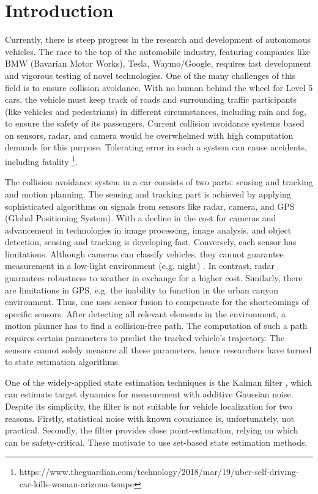 \chapter{Introduction} \label{ch:intro}
Currently, there is steep progress in the research and development of autonomous vehicles. The race to the top of the automobile industry, featuring companies like BMW (Bavarian Motor Works), Tesla, Waymo/Google, requires fast development and vigorous testing of novel technologies. One of the many challenges of this field is to ensure collision avoidance. With no human behind the wheel for Level 5 \cite{SAE2014} cars, the vehicle must keep track of roads and surrounding traffic participants (like vehicles and pedestrians) in different circumstances, including rain and fog, to ensure the safety of its passengers. Current collision avoidance systems based on sensors, radar, and camera would be overwhelmed with high computation demands for this purpose. Tolerating error in such a system can cause accidents, including fatality \footnote{https://www.theguardian.com/technology/2018/mar/19/uber-self-driving-car-kills-woman-arizona-tempe}.


The collision avoidance system in a car consists of two parts: sensing and tracking and motion planning. The sensing and tracking part is achieved by applying sophisticated algorithms on signals from sensors like radar, camera, and GPS (Global Positioning System). With a decline in the cost for cameras and advancement in technologies in image processing, image analysis, and object detection, sensing and tracking is developing fast. Conversely, each sensor has limitations. Although cameras can classify vehicles, they cannot guarantee measurement in a low-light environment (e.g. night) \cite{Hirz2018}. In contrast, radar guarantees robustness to weather in exchange for a higher cost. Similarly, there are limitations in GPS, e.g. the inability to function in the urban canyon environment. Thus, one uses sensor fusion to compensate for the shortcomings of specific sensors. After detecting all relevant elements in the environment, a motion planner has to find a collision-free path. The computation of such a path requires certain parameters to predict the tracked vehicle's trajectory. The sensors cannot solely measure all these parameters, hence researchers have turned to state estimation algorithms.

One of the widely-applied state estimation techniques is the Kalman filter \cite{Kalman}, which can estimate target dynamics for measurement with additive Gaussian noise. Despite its simplicity, the filter is not suitable for vehicle localization for two reasons. Firstly, statistical noise with known covariance is, unfortunately, not practical. Secondly, the filter provides close point-estimation, relying on which can be safety-critical. These motivate to use set-based state estimation methods.


